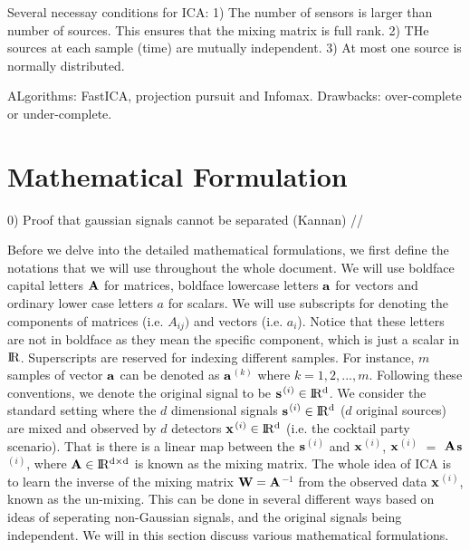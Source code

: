 \documentclass[aps,prl,preprint,superscriptaddress]{revtex4-2}
\begin{document}
Several necessay conditions for ICA: 
1) The number of sensors is larger than number of sources. This ensures that the mixing matrix is full rank.
2) THe sources at each sample (time) are mutually independent.
3) At most one source is normally distributed.


ALgorithms: FastICA, projection pursuit and Infomax. Drawbacks: over-complete or under-complete.





\section{Mathematical Formulation}
0) Proof that gaussian signals cannot be separated (Kannan)
//

Before we delve into the detailed mathematical formulations, we first define the notations that we will use throughout the whole document. We will use boldface capital letters $\bf{A}$ for matrices, boldface lowercase letters $\bf{a}$ for vectors and ordinary lower case letters $a$ for scalars. We will use subscripts for denoting the components of matrices (i.e. $A_{ij})$ and vectors (i.e. $a_{i}$). Notice that these letters are not in boldface as they mean the specific component, which is just a scalar in $ \rm I\!R$. Superscripts are reserved for indexing different samples. For instance, $m$ samples of vector $\bf{a}$ can be denoted as $\bf{a}$$^{(k)}$ where $k = 1, 2, ..., m$. Following these conventions, we denote the original signal to be $\bf{s}$$^{(i)} \in \rm I\!R^{d}$. We consider the standard setting where the $d$ dimensional signals $\bf{s}$$^{(i)} \in \rm I\!R^{d}$ ($d$ original sources) are mixed and observed by $d$ detectors $\bf{x}$$^{(i)} \in \rm I\!R^{d}$ (i.e. the cocktail party scenario). That is there is a linear map between the $\bf{s}$$^{(i)}$ and $\bf{x}$$^{(i)}$, $\bf{x}$$^{(i)}$ $=$ $\bf{A}$$\bf{s}$$^{(i)}$, where $\bf{A} \in \rm I\!R^{d\times d}$ is known as the mixing matrix. The whole idea of ICA is to learn the inverse of the mixing matrix $\bf{W} = \bf{A}$$^{-1}$ from the observed data $\bf{x}$$^{(i)}$, known as the un-mixing. This can be done in several different ways based on ideas of seperating non-Gaussian signals, and the original signals being independent. We will in this section discuss various mathematical formulations. 
\end{document}
